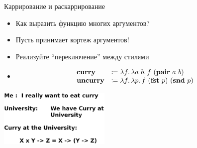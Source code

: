     \begin{frame}{Каррирование и раскаррирование}
        \begin{itemize}
            \item[\todo] Как выразить функцию многих аргументов?
            \item[\answer] \pause Пусть принимает кортеж аргументов!
            \item[\todo] Реализуйте ``переключение'' между стилями
            \item[\answer] \pause
            \[
                \begin{array}{l l}
                    \mathbf{curry}   & \coloneqq \lambda f\ldotp \lambda a~b\ldotp f~ (\mathbf{pair}~a~b)           \\
                    \mathbf{uncurry} & \coloneqq \lambda f\ldotp \lambda p\ldotp f~ (\mathbf{fst}~p)~(\mathbf{snd}~p)
                \end{array}
            \]
        \end{itemize}
        \begin{center}
            \vspace{2em}
            \includegraphics[width=0.4\textwidth]{figs/curry}
        \end{center}
    \end{frame}


